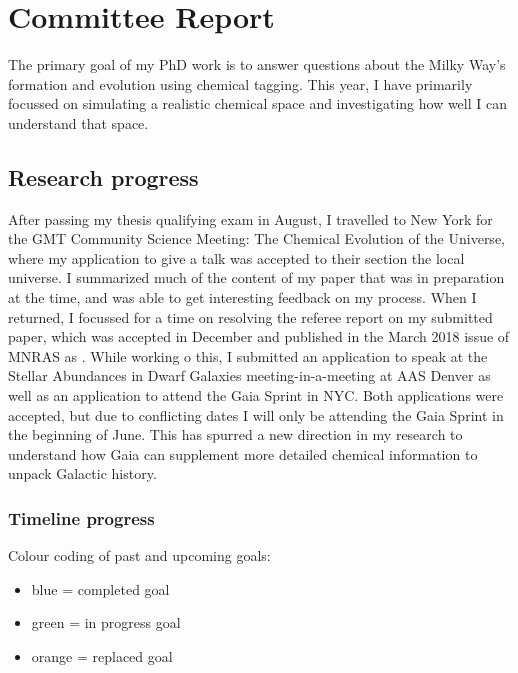 \documentclass[11pt]{article}
\begin{document}
    
    \section*{Committee Report}
    
    The primary goal of my PhD work is to answer questions about the Milky Way's formation and evolution using chemical tagging. This year, I have primarily focussed on simulating a realistic chemical space and investigating how well I can understand that space.    

    \subsection*{Research progress}
    
    After passing my thesis qualifying exam in August, I travelled to New York for the GMT Community Science Meeting: The Chemical Evolution of the Universe, where my application to give a talk was accepted to their section the local universe. I summarized much of the content of my paper that was in preparation at the time, and was able to get interesting feedback on my process. When I returned, I focussed for a time on resolving the referee report on my submitted paper, which was accepted in December and published in the March 2018 issue of MNRAS as \citet{Price-Jones2018}. While working o this, I submitted an application to speak at the Stellar Abundances in Dwarf Galaxies meeting-in-a-meeting at AAS Denver as well as an application to attend the Gaia Sprint in NYC. Both applications were accepted, but due to conflicting dates I will only be attending the Gaia Sprint in the beginning of June. This has spurred a new direction in my research to understand how Gaia can supplement more detailed chemical information to unpack Galactic history.
    
    \subsubsection*{Timeline progress}
    
    Colour coding of past and upcoming goals:
    
    \begin{itemize}
    	\item {\color{RoyalBlue}blue} = completed goal
    	\item {\color{ForestGreen} green} = in progress goal
    	\item {\color{BurntOrange} orange} = replaced goal
    \end{itemize}
    
\end{document}
